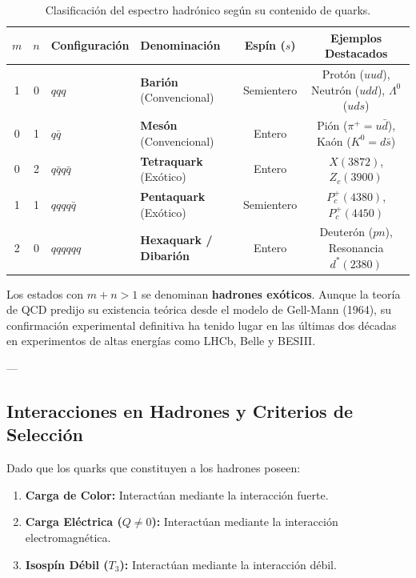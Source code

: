 \begin{table}[h!]
\centering
\caption{Clasificación del espectro hadrónico según su contenido de quarks.}
\label{tab:hadron_classification}
\vspace{0.3cm}
\small
\begin{tabularx}{\linewidth}{c c X l c c}
\toprule
\textbf{$m$} & \textbf{$n$} & \textbf{Configuración} & \textbf{Denominación} & \textbf{Espín ($s$)} & \textbf{Ejemplos Destacados} \\
\midrule
1 & 0 & $q q q$ & \textbf{Barión} (Convencional) & Semientero & Protón ($uud$), Neutrón ($udd$), $\Lambda^0$ ($uds$) \\
0 & 1 & $q \bar{q}$ & \textbf{Mesón} (Convencional) & Entero & Pión ($\pi^+ = u\bar{d}$), Kaón ($K^0 = d\bar{s}$) \\
\midrule
0 & 2 & $q \bar{q} q \bar{q}$ & \textbf{Tetraquark} (Exótico) & Entero & $X(3872)$, $Z_c(3900)$ \\
1 & 1 & $q q q q \bar{q}$ & \textbf{Pentaquark} (Exótico) & Semientero & $P_c^+(4380)$, $P_c^+(4450)$ \\
2 & 0 & $q q q q q q$ & \textbf{Hexaquark / Dibarión} & Entero & Deuterón ($pn$), Resonancia $d^*(2380)$ \\
\bottomrule
\end{tabularx}
\end{table}

\begin{observacion}
Los estados con $m+n > 1$ se denominan \textbf{hadrones exóticos}. Aunque la teoría de QCD predijo su existencia teórica desde el modelo de Gell-Mann (1964), su confirmación experimental definitiva ha tenido lugar en las últimas dos décadas en experimentos de altas energías como LHCb, Belle y BESIII.
\end{observacion}

---

\subsection{Interacciones en Hadrones y Criterios de Selección}

Dado que los quarks que constituyen a los hadrones poseen:
\begin{enumerate}[label=\roman*)]
    \item \textbf{Carga de Color:} Interactúan mediante la interacción fuerte.
    \item \textbf{Carga Eléctrica ($Q \ne 0$):} Interactúan mediante la interacción electromagnética.
    \item \textbf{Isospín Débil ($T_3$):} Interactúan mediante la interacción débil.
\end{enumerate}

